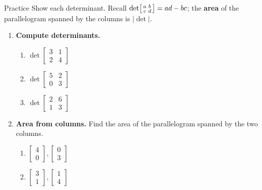 \documentclass[10pt]{article}
\begin{document}
\namedateperiod

\vspace{0.12in}

\begin{notesbox}{Practice}
Show each determinant. Recall $\det\begin{bsmallmatrix} a & b\\ c & d \end{bsmallmatrix}=ad-bc$;
the \textbf{area} of the parallelogram spanned by the columns is $|\det|$.

\begin{enumerate}[leftmargin=1.9em, itemsep=12pt]
  \item \textbf{Compute determinants.}
    \begin{enumerate}[label=(\alph*), leftmargin=1.8em, itemsep=4pt]
      \item $\det\begin{bmatrix} 3 & 1 \\ 2 & 4 \end{bmatrix}$ \hfill {}
      \item $\det\begin{bmatrix} 5 & 2 \\ 0 & 3 \end{bmatrix}$ \hfill {}
      \item $\det\begin{bmatrix} 2 & 6 \\ 1 & 3 \end{bmatrix}$ \hfill {}
    \end{enumerate}
  \item \textbf{Area from columns.} Find the area of the parallelogram spanned by the two columns.
    \begin{enumerate}[label=(\alph*), leftmargin=1.8em, itemsep=4pt]
      \item $\begin{bmatrix} 4 \\ 0 \end{bmatrix}, \begin{bmatrix} 0 \\ 3 \end{bmatrix}$ \hfill {}
      \item $\begin{bmatrix} 3 \\ 1 \end{bmatrix}, \begin{bmatrix} 1 \\ 4 \end{bmatrix}$ \hfill {}

\end{enumerate}
\end{enumerate}
\end{notesbox}
\end{document}
